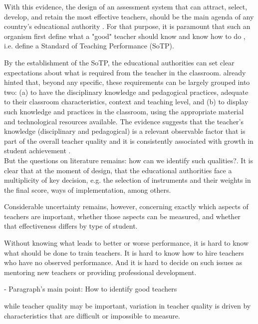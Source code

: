 With this evidence, the design of an assessment system that can attract, select, develop, and retain the most effective teachers, should be the main agenda of any country's educational authority \citep{Elacqua_et_al_2018}. For that purpose, it is paramount that such an organism first define what a "good" teacher should know and know how to do \citep{Hincapie_et_al_2020}, i.e. define a Standard of Teaching Performance (SoTP). 

By the establishment of the SoTP, the educational authorities can set clear expectations about what is required from the teacher in the classroom. \citet{Hincapie_et_al_2020} already hinted that, beyond any specific, these requirements can be largely grouped into two: (a) to have the disciplinary knowledge and pedagogical practices, adequate to their classroom characteristics, context and teaching level, and (b) to display such knowledge and practices in the classroom, using the appropriate material and technological resources available. The evidence suggests that the teacher's knowledge (disciplinary and pedagogical) is a relevant observable factor that is part of the overall teacher quality and it is consistently associated with growth in student achievement \citep{Metzler_et_al_2012, Araujo_et_al_2016}. \\

But the questions on literature remains: how can we identify such qualities?.
It is clear that at the moment of design, that the educational authorities face a multiplicity of key decision, e.g. the selection of instruments and their weights in the final score, ways of implementation, among others.  

Considerable uncertainty remains, however, concerning exactly which aspects of teachers are important, whether those aspects can be measured, and whether that effectiveness differs by type of student. \citep{Clotfelter_et_al_2006}

Without knowing what leads to better or worse performance, it is hard to know what should be done to train teachers. It is hard to know how to hire teachers who have no observed performance. And it is hard to decide on such issues as mentoring new teachers or providing professional development. \citep{Hanushek_et_al_2012}

- Paragraph's main point: How to identify good teachers

while teacher quality may be important, variation in teacher quality is driven by characteristics that are difficult or impossible to measure. \citep{Rockoff_2004}


